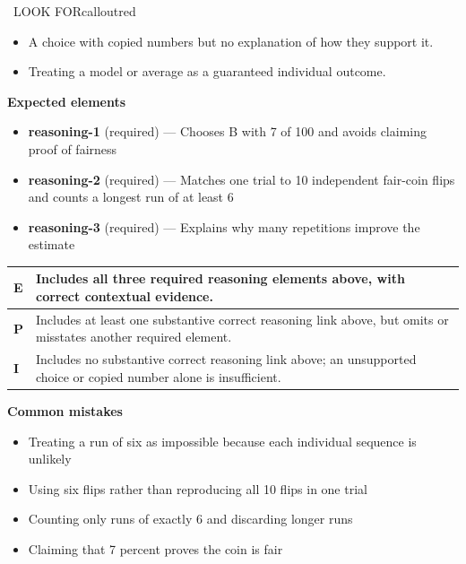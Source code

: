 \documentclass[11pt]{article}
\begin{document}
\begin{callout}{\IconWarn\ LOOK FOR}{calloutred}
\begin{itemize}[leftmargin=1.5em,itemsep=2pt,topsep=2pt]
  \item A choice with copied numbers but no explanation of how they support it.
  \item Treating a model or average as a guaranteed individual outcome.
\end{itemize}
\end{callout}


\textbf{Expected elements}
\begin{itemize}[leftmargin=1.5em,itemsep=2pt,topsep=2pt]
  \item \textbf{reasoning-1} (required) --- Chooses B with 7 of 100 and avoids claiming proof of fairness
  \item \textbf{reasoning-2} (required) --- Matches one trial to 10 independent fair-coin flips and counts a longest run of at least 6
  \item \textbf{reasoning-3} (required) --- Explains why many repetitions improve the estimate
\end{itemize}

{\small\renewcommand{\arraystretch}{1.25}
\noindent\begin{tabular}{|p{0.5in}|p{5.9in}|}
\hline
\textbf{E} & Includes all three required reasoning elements above, with correct contextual evidence. \\ \hline
\textbf{P} & Includes at least one substantive correct reasoning link above, but omits or misstates another required element. \\ \hline
\textbf{I} & Includes no substantive correct reasoning link above; an unsupported choice or copied number alone is insufficient. \\ \hline
\end{tabular}}

\textbf{Common mistakes}
\begin{itemize}[leftmargin=1.5em,itemsep=2pt,topsep=2pt]
  \item Treating a run of six as impossible because each individual sequence is unlikely
  \item Using six flips rather than reproducing all 10 flips in one trial
  \item Counting only runs of exactly 6 and discarding longer runs
  \item Claiming that 7 percent proves the coin is fair
\end{itemize}
\end{document}
